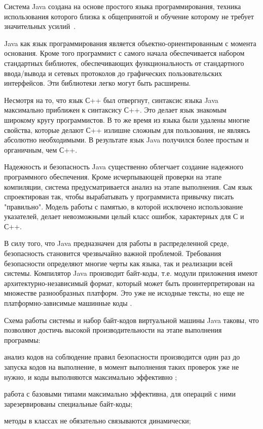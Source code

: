 Система Java создана на основе простого языка программирования, техника использования которого близка к общепринятой и обучение которому не требует значительных усилий~\cite{java_book}.

Java как язык программирования является объектно-ориентированным с момента основания. Кроме того программист с самого начала обеспечивается набором стандартных библиотек, обеспечивающих функциональность от стандартного ввода/вывода и сетевых протоколов до графических пользовательских интерфейсов. Эти библиотеки легко могут быть расширены.

Несмотря на то, что язык С++ был отвергнут, синтаксис языка Java максимально приближен к синтаксису С++. Это делает язык знакомым широкому кругу программистов. В то же время из языка были удалены многие свойства, которые делают С++ излишне сложным для пользования, не являясь абсолютно необходимыми. В результате язык Java получился более простым и органичным, чем С++.

Надежность и безопасность Java существенно облегчает создание надежного программного обеспечения. Кроме исчерпывающей проверки на этапе компиляции, система предусматривается анализ на этапе выполнения. Сам язык спроектирован так, чтобы вырабатывать у программиста привычку писать "правильно". Модель работы с памятью, в которой исключено использование указателей, делает невозможными целый класс ошибок, характерных для С и С++.

В силу того, что Java предназначен для работы в распределенной среде, безопасность становится чрезвычайно важной проблемой. Требования безопасности определяют многие черты как языка, так и реализации всей системы.
Компилятор Java производит байт-коды, т.е. модули приложения имеют архитектурно-независимый формат, который может быть проинтерпретирован на множестве разнообразных платформ. Это уже не исходные тексты, но еще не платформно-зависимые машинные коды .

Схема работы системы и набор байт-кодов виртуальной машины Java таковы, что позволяют достичь высокой производительности на этапе выполнения программы:

анализ кодов на соблюдение правил безопасности производится один раз до запуска кодов на выполнение, в момент выполнения таких проверок уже не нужно, и коды выполняются максимально эффективно ;

работа с базовыми типами максимально эффективна, для операций с ними зарезервированы специальные байт-коды;

методы в классах не обязательно связываются динамически;

